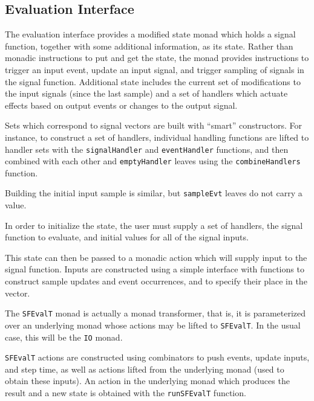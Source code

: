 \subsection{Evaluation Interface}
\label{subsection:System_Design_and_Interface-Evaluation_Interface}


The evaluation interface provides a modified state monad which holds a signal
function, together with some additional information, as its state.
Rather than monadic instructions to put and get the state, the monad provides instructions
to trigger an input event, update an input signal, and trigger sampling of
signals in the signal function. Additional state includes the current set of
modifications to the input signals (since the last sample) and a set of
handlers which actuate effects based on output events or changes to the output
signal.

Sets which correspond to signal vectors are built with ``smart'' constructors.
For instance, to construct a set of handlers, 
individual handling functions are
lifted to handler sets with the {\tt signalHandler} and {\tt eventHandler}
functions, and then combined with each other and {\tt emptyHandler} leaves
using the {\tt combineHandlers} function.
%

Building the initial input sample is similar, but {\tt sampleEvt} leaves do
not carry a value.

In order to initialize the state, the user must supply a set of handlers, the
signal function to evaluate, and initial values for all of the signal inputs.

This state can then be passed to a monadic action which will supply input to
the signal function. Inputs are constructed using a simple interface with
functions to construct sample updates and event occurrences, and to specify
their place in the vector.

The {\tt SFEvalT} monad is actually a monad transformer, that is, it is
parameterized over an underlying monad whose actions may be lifted to
{\tt SFEvalT}. In the usual case, this will be the {\tt IO} monad.

{\tt SFEvalT} actions are constructed using combinators to push events,
update inputs, and step time, as well as actions lifted from the underlying
monad (used to obtain these inputs). 
An action in the underlying monad
which produces the result and a new state is obtained with the {\tt runSFEvalT}
function.
